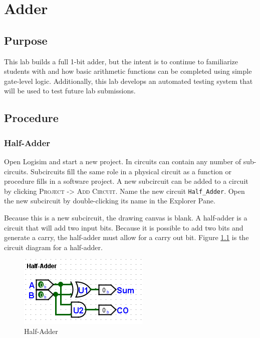 \chapter{Adder}\label{add}

\section{Purpose}

This lab builds a full 1-bit adder, but the intent is to continue to familiarize students with \LE and how basic arithmetic functions can be completed using simple gate-level logic. Additionally, this lab develops an automated testing system that will be used to test future lab submissions.

\section{Procedure}

\subsection{Half-Adder}

Open Logisim and start a new project. In \LE circuits can contain any number of sub-circuits. Subcircuits fill the same role in a physical circuit as a function or procedure fills in a software project. A new subcircuit can be added to a circuit by clicking \textsc{Project -> Add Circuit}. Name the new circuit \lstinline[columns=fixed]|Half_Adder|. Open the new subcircuit by double-clicking its name in the Explorer Pane. 

Because this is a new subcircuit, the drawing canvas is blank. A half-adder is a circuit that will add two input bits. Because it is possible to add two bits and generate a carry, the half-adder must allow for a carry out bit. Figure \ref{fig:add-01} is the circuit diagram for a half-adder.

\begin{figure}[H]
	\centering
	\includegraphics[width=\maxwidth{.95\linewidth}]{gfx/add-01}
	\caption{Half-Adder}
	\label{fig:add-01}
\end{figure}

